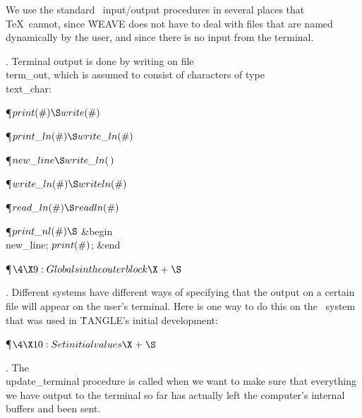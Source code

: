 We use the standard \PASCAL\ input/output procedures in several places that
\TeX\ cannot, since \.{WEAVE} does not have to deal with files that are named
dynamically by the user, and since there is no input from the terminal.

\fi

\*. Terminal output is done by writing on file \\{term\_out}, which is
assumed to
consist of characters of type \\{text\_char}:

\Y\P\D {}$\\{print}(\#)\S\\{write}(\#)$\par
\P\D {}$\\{print\_ln}(\#)\S\\{write\_ln}(\#)$\par
\P\D {}$\\{new\_line}\S\\{write\_ln}(\,)$\par
\P\D {}$\\{write\_ln}(\#)\S\\{writeln}(\#)$\par
\P\D {}$\\{read\_ln}(\#)\S\\{readln}(\#)$\par
\P\D {}$\\{print\_nl}(\#)\S$\6
\&{begin} \\{new\_line};\5
$\\{print}(\#)$;\6
\&{end}\par
\Y\P$\4\X9:Globals in the outer block\X\mathrel{+}\S$\6
\par
\fi

\*. Different systems have different ways of specifying that the output on
a
certain file will appear on the user's terminal. Here is one way to do this
on the \PASCAL\ system that was used in \.{TANGLE}'s initial development:

\Y\P$\4\X10:Set initial values\X\mathrel{+}\S$\6
\par
\fi

\*. The \\{update\_terminal} procedure is called when we want
to make sure that everything we have output to the terminal so far has
actually left the computer's internal buffers and been sent.

